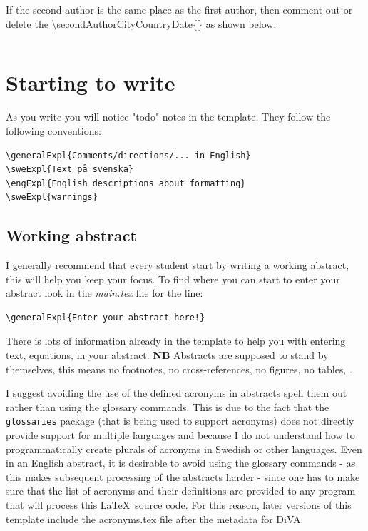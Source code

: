 \documentclass[main.tex]{subfiles}
\begin{document}
If the second author is the same place as the first author, then comment out or delete the \textbackslash secondAuthorCityCountryDate\{\} as shown below:
\begin{lstlisting}[style=latexExampleForAuthors]
%\secondAuthorCityCountryDate{}
\end{lstlisting}

\section{Starting to write}
\label{sec:startingToWrite}

As you write you will notice "todo" notes in the template. They follow the following conventions:
\begin{lstlisting}[style=latexExampleForAuthors]
\generalExpl{Comments/directions/... in English}
\sweExpl{Text på svenska}
\engExpl{English descriptions about formatting}
\sweExpl{warnings}
\end{lstlisting}


\subsection{Working abstract}
\label{sec:wrtingFirstAbstract}
I generally recommend that every student start by writing a working abstract, this will help you keep your focus. To find where you can start to enter your abstract look in the \textit{main.tex} file for the line:
\begin{lstlisting}[style=latexExampleForAuthors]
\generalExpl{Enter your abstract here!}
\end{lstlisting}

There is lots of information already in the template to help you with entering text, equations, \etc in your abstract. \textbf{NB} Abstracts are supposed to stand by themselves, this means no footnotes, no cross-references, no figures, no tables, \etc.

I suggest avoiding the use of the defined acronyms in abstracts \ie spell them out rather than using the glossary commands. This is due to the fact that the \texttt{glossaries} package (that is being used to support acronyms) does not directly provide support for multiple languages and because I do not understand how to programmatically create plurals of acronyms in Swedish or other languages. Even in an English abstract, it is desirable to avoid using the glossary commands - as this makes subsequent processing of the abstracts harder - since one has to make sure that the list of acronyms and their definitions are provided to any program that will process this \LaTeX\  source code. For this reason, later versions of this template include the acronyms.tex file after the metadata for DiVA.
\end{document}
